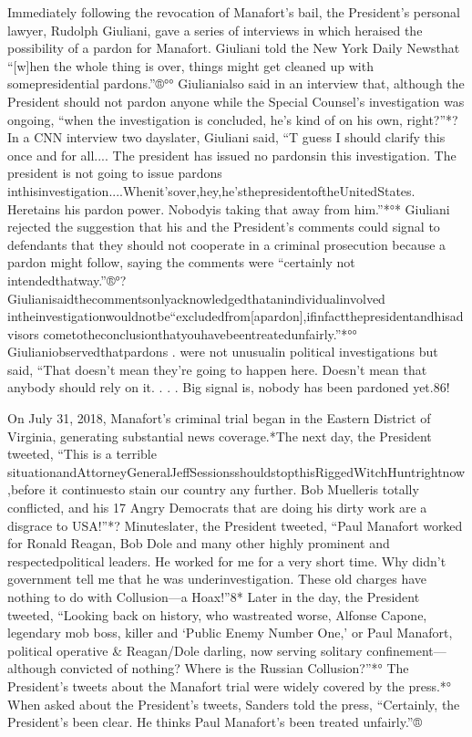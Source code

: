 Immediately following the revocation of Manafort’s bail, the President’s personal lawyer, Rudolph Giuliani, gave a series of interviews in which heraised the possibility of a pardon for Manafort. Giuliani told the New York Daily Newsthat “[w]hen the whole thing is over, things might get cleaned up with somepresidential pardons.”®°° Giulianialso said in an interview that, although the President should not pardon anyone while the Special Counsel’s investigation was ongoing, “when the investigation is concluded, he’s kind of on his own, right?”*? In a CNN interview two dayslater, Giuliani said, “T guess I should clarify this once and for all.... The president has issued no pardonsin this investigation. The president is not going to issue pardons inthisinvestigation....Whenit’sover,hey,he’sthepresidentoftheUnitedStates. Heretains his pardon power. Nobodyis taking that away from him.”*°* Giuliani rejected the suggestion that his and the President’s comments could signal to defendants that they should not cooperate in a criminal prosecution because a pardon might follow, saying the comments were “certainly not intendedthatway.”®°? Giulianisaidthecommentsonlyacknowledgedthatanindividualinvolved intheinvestigationwouldnotbe“excludedfrom[apardon],ifinfactthepresidentandhisadvisors
cometotheconclusionthatyouhavebeentreatedunfairly.”*°° Giulianiobservedthatpardons
.
were not unusualin political investigations but said, “That doesn’t mean they’re going to happen here. Doesn’t mean that anybody should rely on it. . . . Big signal is, nobody has been pardoned yet.86!

On July 31, 2018, Manafort’s criminal trial began in the Eastern District of Virginia, generating substantial news coverage.*The next day, the President tweeted, “This is a terrible situationandAttorneyGeneralJeffSessionsshouldstopthisRiggedWitchHuntrightnow,before it continuesto stain our country any further. Bob Muelleris totally conflicted, and his 17 Angry Democrats that are doing his dirty work are a disgrace to USA!”*? Minuteslater, the President tweeted, “Paul Manafort worked for Ronald Reagan, Bob Dole and many other highly prominent and respectedpolitical leaders. He worked for me for a very short time. Why didn’t government tell me that he was underinvestigation. These old charges have nothing to do with Collusion—a Hoax!”8* Later in the day, the President tweeted, “Looking back on history, who wastreated worse, Alfonse Capone, legendary mob boss, killer and ‘Public Enemy Number One,’ or Paul Manafort, political operative & Reagan/Dole darling, now serving solitary confinement—although convicted of nothing? Where is the Russian Collusion?”*° The President’s tweets about the Manafort trial were widely covered by the press.*° When asked about the President’s tweets, Sanders told the press, “Certainly, the President’s been clear. He thinks Paul Manafort’s been treated unfairly.”®%

